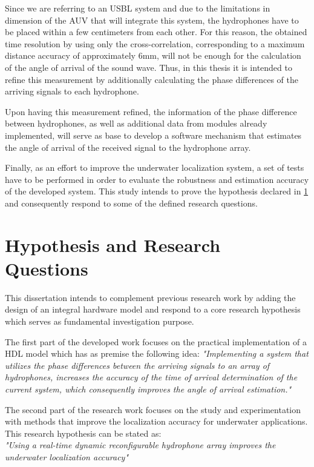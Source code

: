 Since we are referring to an USBL system and due to the limitations in dimension of the AUV that will integrate this system, the hydrophones have to be placed within a few centimeters from each other. For this reason, the obtained time resolution by using only the cross-correlation, corresponding to a maximum distance accuracy of approximately 6mm, will not be enough for the calculation of the angle of arrival of the sound wave. Thus, in this thesis it is intended to refine this measurement by additionally calculating the phase differences of the arriving signals to each hydrophone. 

Upon having this measurement refined, the information of the phase difference between hydrophones, as well as additional data from modules already implemented, will serve as base to develop a software mechanism that estimates the angle of arrival of the received signal to the hydrophone array.

Finally, as an effort to improve the underwater localization system, a set of tests have to be performed in order to evaluate the robustness and estimation accuracy of the developed system. This study intends to prove the hypothesis declared in \ref{sec:hypoth-rq} and consequently respond to some of the defined research questions.


\section{Hypothesis and Research Questions} \label{sec:hypoth-rq}

This dissertation intends to complement previous research work by adding the design of an integral hardware model and respond to a core research hypothesis which serves as fundamental investigation purpose.

The first part of the developed work focuses on the practical implementation of a HDL model which has as premise the following idea: \textit{"Implementing a system that utilizes the phase differences between the arriving signals to an array of hydrophones, increases the accuracy of the time of arrival determination of the current system, which consequently improves the angle of arrival estimation."}

The second part of the research work focuses on the study and experimentation with methods that improve the localization accuracy for underwater applications. This research hypothesis can be stated as:
\\

\textit{"Using a real-time dynamic reconfigurable hydrophone array improves the underwater localization accuracy"}
\\

